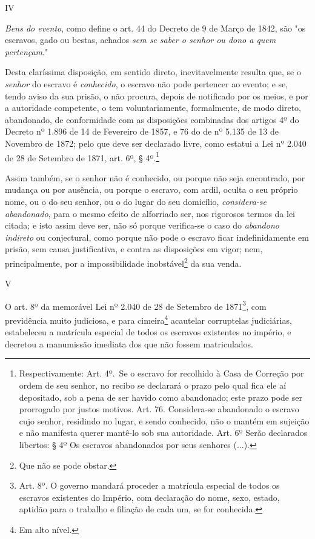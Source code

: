 IV

\emph{Bens do evento}, como define o art. 44 do Decreto de 9 de Março de
1842, são "os escravos, gado ou bestas, achados \emph{sem se saber o
senhor ou dono a quem pertençam}."

Desta claríssima disposição, em sentido direto, inevitavelmente resulta
que, se o \emph{senhor} do escravo é \emph{conhecido}, o escravo não
pode pertencer ao evento; e se, tendo aviso da sua prisão, o não
procura, depois de notificado por os meios, e por a autoridade
competente, o tem voluntariamente, formalmente, de modo direto,
abandonado, de conformidade com as disposições combinadas dos artigos 4º
do Decreto nº 1.896 de 14 de Fevereiro de 1857, e 76 do de nº 5.135 de
13 de Novembro de 1872; pelo que deve ser declarado livre, como estatui
a Lei nº 2.040 de 28 de Setembro de 1871, art. 6º, § 4º.\footnote{
  Respectivamente: Art. 4º.~Se o escravo for recolhido à Casa de
  Correção por ordem de seu senhor, no recibo se declarará o prazo pelo
  qual fica ele aí depositado, sob a pena de ser havido como abandonado;
  este prazo pode ser prorrogado por justos motivos. Art. 76.
  Considera-se abandonado o escravo cujo senhor, residindo no lugar, e
  sendo conhecido, não o mantém em sujeição e não manifesta querer
  mantê-lo sob sua autoridade. Art. 6º Serão declarados libertos: § 4º
  Os escravos abandonados por seus senhores (...).}

Assim também, se o senhor não é conhecido, ou porque não seja
encontrado, por mudança ou por ausência, ou porque o escravo, com ardil,
oculta o seu próprio nome, ou o do seu senhor, ou o do lugar do seu
domicílio, \emph{considera-se abandonado}, para o mesmo efeito de
alforriado ser, nos rigorosos termos da lei citada; e isto assim deve
ser, não só porque verifica-se o caso do \emph{abandono indireto} ou
conjectural, como porque não pode o escravo ficar indefinidamente em
prisão, sem causa justificativa, e contra as disposições em vigor; nem,
principalmente, por a impossibilidade inobstável\footnote{Que não se
  pode obstar.} da sua venda.

V

O art. 8º da memorável Lei nº 2.040 de 28 de Setembro de 1871\footnote{
  Art. 8º. O governo mandará proceder a matrícula especial de todos os
  escravos existentes do Império, com declaração do nome, sexo, estado,
  aptidão para o trabalho e filiação de cada um, se for conhecida.}, com
previdência muito judiciosa, e para cimeira\footnote{Em alto nível.}
acautelar corruptelas judiciárias, estabeleceu a matrícula especial de
todos os escravos existentes no império, e decretou a manumissão
imediata dos que não fossem matriculados.

